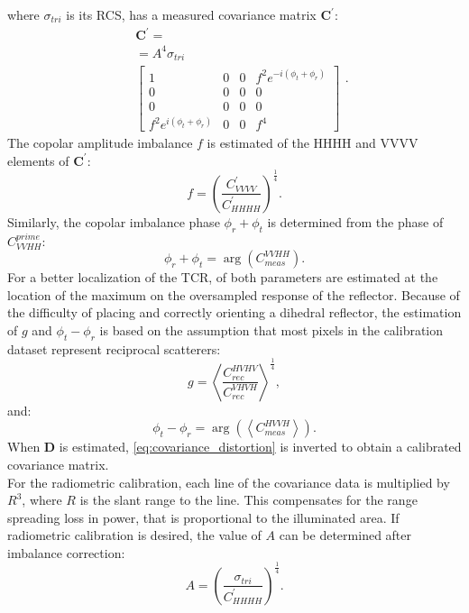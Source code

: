 where $\sigma_{tri}$ is its RCS, has a measured covariance matrix $\mathbf{C^{\prime}}$:
\begin{equation}
	\begin{aligned}
	&\mathbf{C^{\prime}} =\\
	&= A^4 \sigma_{tri}\\
	&\begin{bmatrix}
		1 & 0 & 0 & f^2 e^{-i \left(\phi_t + \phi_r\right)}\\
		0 & 0 & 0 & 0\\
		0 & 0 & 0 & 0\\
		f^2 e^{i \left(\phi_t + \phi_r\right)} & 0 & 0 & f^4
	\end{bmatrix}
	\end{aligned}.
\end{equation}
The copolar amplitude imbalance $f$ is estimated of the HHHH and VVVV elements of $\mathbf{C^{\prime}}$:
\begin{equation}
	f = \left(\frac{C^{\prime}_{VVVV}}{C^{\prime}_{HHHH}}\right)^{\frac{1}{4}}.
\end{equation}
Similarly, the copolar imbalance phase $\phi_r + \phi_t$ is determined from the phase of $C_{VVHH}^{prime}$:
\begin{equation}
	\phi_r + \phi_t = \operatorname{arg}\left(C_{meas}^{VVHH}\right).
\end{equation}
For a better localization of the TCR, of both parameters are estimated at the location of the maximum on the oversampled response of the reflector.
Because of the difficulty of placing and correctly orienting a dihedral reflector, the estimation of $g$ and $\phi_t - \phi_r$ is based on the assumption that most pixels in the calibration dataset represent reciprocal scatterers:
\begin{equation}
	g = \left<\frac{C_{rec}^{HVHV}}{C_{rec}^{VHVH}}\right>^\frac{1}{4},
\end{equation}
and:
\begin{equation}
	\phi_t - \phi_r =\operatorname{arg}\left( \left<C_{meas}^{HVVH}\right>\right).
\end{equation}
When $\mathbf{D}$ is estimated, \autoref{eq:covariance_distortion} is inverted to obtain a calibrated covariance matrix.\\
For the radiometric calibration, each line of the covariance data is multiplied by $R^3$, where $R$ is the slant range to the line. This compensates for the range spreading loss in power, that is proportional to the illuminated area. If radiometric calibration is desired, the value of $A$ can be determined after imbalance correction:
\begin{equation}
	A =	\left(\frac{\sigma_{tri}}{C^{\prime}_{HHHH}}\right)^{\frac{1}{4}}.
\end{equation}
